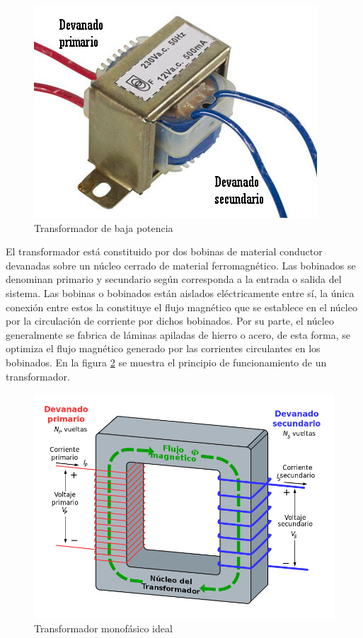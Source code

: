 \begin{figure}[h]
	\centering
	\includegraphics[scale=.5]{./Figures/transformador.jpg}
	\caption{Transformador de baja potencia\protect\footnotemark}
	\label{fig:figTransformador}
\end{figure}


El transformador está constituido por dos bobinas de material conductor devanadas sobre un núcleo cerrado de material ferromagnético. Las bobinados se denominan primario y secundario según corresponda a la entrada o salida del sistema. Las bobinas o bobinados están aislados eléctricamente entre sí, la única conexión entre estos la constituye el flujo magnético que se establece en el núcleo por la circulación de corriente por dichos bobinados. Por su parte, el núcleo generalmente se fabrica de láminas apiladas de hierro o acero, de esta forma, se optimiza el flujo magnético generado por las corrientes circulantes en los bobinados. En la figura \ref{fig:figTransformador2} se muestra el principio de funcionamiento de un transformador.

\begin{figure}[htpb]
	\centering
	\includegraphics[scale=.3]{./Figures/transformador_2.png}
	\caption{Transformador monofásico ideal\protect\footnotemark}
	\label{fig:figTransformador2}
\end{figure}

